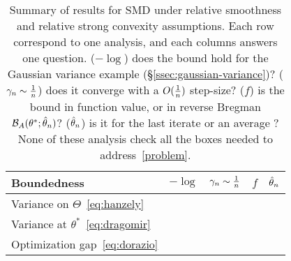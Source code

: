 \begin{table}[t]
	\newcommand*{\greencmark}{\textcolor{Green}{\cmark}}
	\newcommand*{\redxmark}{\textcolor{Red}{\xmark}}
	\caption[Summary of results for SMD]{Summary of results for SMD
		under relative smoothness and relative strong convexity assumptions.
		Each row correspond to one analysis, and each columns answers one question.
		($-\log$) does the bound hold for the Gaussian variance example (\S\ref{ssec:gaussian-variance})?
		($\gamma_n \sim \frac{1}{n}$) does it converge with a $O(\frac{1}{n})$ step-size?
		($f$) is the bound in function value, or in reverse Bregman ${\mathcal B}_A(\theta^* ; \hat{\theta}_n)$?
		($\hat{\theta}_n$) is it for the last iterate or an average ?
		None of these analysis check all the boxes needed to address~\eqref{problem}.
	}
	\begin{center}
		\begin{tabular}{lcccc}
			\toprule
			Boundedness & $-\log$ &  $\gamma_n \sim \frac{1}{n}$ & $f$ & $\hat{\theta}_n$ \\
			\midrule
			Variance on $\Theta$~\eqref{eq:hanzely} %
			& \redxmark & \greencmark & \greencmark  & \redxmark
			\\
			Variance at $\theta^*$~\eqref{eq:dragomir} %
			& \redxmark & \greencmark & \redxmark  & \greencmark
			\\
			Optimization gap~\eqref{eq:dorazio} %
			& \greencmark & \redxmark & \redxmark & \greencmark
			\\
			\bottomrule
		\end{tabular}
	\end{center}
	\label{tbl:assumptions}
\end{table}



